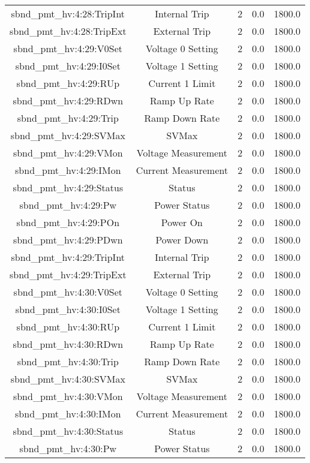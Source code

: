 \begin{center}
\begin{longtable}{c | c c c c }
sbnd\_pmt\_hv:4:28:TripInt & Internal Trip & 2 & 0.0 & 1800.0\\ 
sbnd\_pmt\_hv:4:28:TripExt & External Trip & 2 & 0.0 & 1800.0\\ 
sbnd\_pmt\_hv:4:29:V0Set & Voltage 0 Setting & 2 & 0.0 & 1800.0\\ 
sbnd\_pmt\_hv:4:29:I0Set & Voltage 1 Setting & 2 & 0.0 & 1800.0\\ 
sbnd\_pmt\_hv:4:29:RUp & Current 1 Limit & 2 & 0.0 & 1800.0\\ 
sbnd\_pmt\_hv:4:29:RDwn & Ramp Up Rate & 2 & 0.0 & 1800.0\\ 
sbnd\_pmt\_hv:4:29:Trip & Ramp Down Rate & 2 & 0.0 & 1800.0\\ 
sbnd\_pmt\_hv:4:29:SVMax & SVMax & 2 & 0.0 & 1800.0\\ 
sbnd\_pmt\_hv:4:29:VMon & Voltage Measurement & 2 & 0.0 & 1800.0\\ 
sbnd\_pmt\_hv:4:29:IMon & Current Measurement & 2 & 0.0 & 1800.0\\ 
sbnd\_pmt\_hv:4:29:Status & Status & 2 & 0.0 & 1800.0\\ 
sbnd\_pmt\_hv:4:29:Pw & Power Status & 2 & 0.0 & 1800.0\\ 
sbnd\_pmt\_hv:4:29:POn & Power On & 2 & 0.0 & 1800.0\\ 
sbnd\_pmt\_hv:4:29:PDwn & Power Down & 2 & 0.0 & 1800.0\\ 
sbnd\_pmt\_hv:4:29:TripInt & Internal Trip & 2 & 0.0 & 1800.0\\ 
sbnd\_pmt\_hv:4:29:TripExt & External Trip & 2 & 0.0 & 1800.0\\ 
sbnd\_pmt\_hv:4:30:V0Set & Voltage 0 Setting & 2 & 0.0 & 1800.0\\ 
sbnd\_pmt\_hv:4:30:I0Set & Voltage 1 Setting & 2 & 0.0 & 1800.0\\ 
sbnd\_pmt\_hv:4:30:RUp & Current 1 Limit & 2 & 0.0 & 1800.0\\ 
sbnd\_pmt\_hv:4:30:RDwn & Ramp Up Rate & 2 & 0.0 & 1800.0\\ 
sbnd\_pmt\_hv:4:30:Trip & Ramp Down Rate & 2 & 0.0 & 1800.0\\ 
sbnd\_pmt\_hv:4:30:SVMax & SVMax & 2 & 0.0 & 1800.0\\ 
sbnd\_pmt\_hv:4:30:VMon & Voltage Measurement & 2 & 0.0 & 1800.0\\ 
sbnd\_pmt\_hv:4:30:IMon & Current Measurement & 2 & 0.0 & 1800.0\\ 
sbnd\_pmt\_hv:4:30:Status & Status & 2 & 0.0 & 1800.0\\ 
sbnd\_pmt\_hv:4:30:Pw & Power Status & 2 & 0.0 & 1800.0\\ 

\end{longtable}
\end{center}
